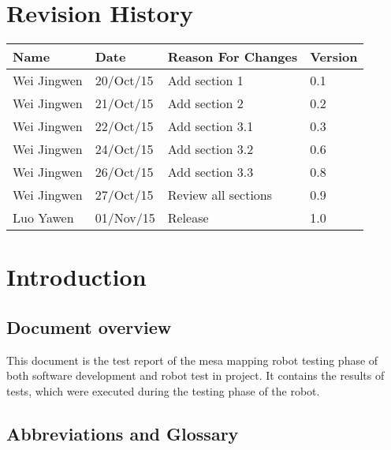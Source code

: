 \documentclass[11pt, a4paper]{article}
\begin{document}
\section*{Revision History}
\small
\begin{tabular} 
	 {|m{3cm}|m{2cm}|m{8cm}|m{2cm}|}
	\hline
	\textbf{Name} &  \textbf{Date} & \textbf{Reason For Changes} & \textbf{Version} \\ [0.5ex]
	\hline
	Wei Jingwen & 20/Oct/15 & Add section 1 & 0.1 \\ [0.5ex]
	\hline
	Wei Jingwen & 21/Oct/15 & Add section 2 & 0.2 \\ [0.5ex]
	\hline
	Wei Jingwen & 22/Oct/15 & Add section 3.1 & 0.3 \\ [0.5ex]
	\hline
	Wei Jingwen & 24/Oct/15 & Add section 3.2 & 0.6 \\ [0.5ex]
	\hline
	Wei Jingwen & 26/Oct/15 & Add section 3.3 & 0.8 \\ [0.5ex]
	\hline
	Wei Jingwen & 27/Oct/15 & Review all sections & 0.9 \\ [0.5ex]
	\hline
	Luo Yawen & 01/Nov/15 & Release & 1.0 \\ [0.5ex]
	\hline

	
\end{tabular}
\cleardoublepage

\newpage


\setcounter{page}{1}
\section{Introduction}
\subsection{Document overview}
This document is the test report of the mesa mapping robot testing phase of both software development and robot test in project. It contains the results of tests, which were executed during the testing phase of the robot.

\subsection{Abbreviations and Glossary}
\end{document}
